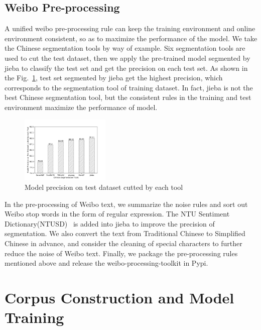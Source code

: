 \documentclass[runningheads]{llncs}
\begin{document}
\subsection{Weibo Pre-processing}

A unified weibo pre-processing rule can keep the training environment and online environment consistent, so as to maximize the performance of the model. We take the Chinese segmentation tools by way of example. Six segmentation tools are used to cut the test dataset, then we apply the pre-trained model segmented by jieba to classify the test set and get the precision on each test set. As shown in the Fig.~\ref{fig:segmentation-tools-precision}, test set segmented by jieba get the highest precision, which corresponds to the segmentation tool of training dataset. In fact, jieba is not the best Chinese segmentation tool, but the consistent rules in the training and test environment maximize the performance of model.

\begin{figure}[ht]
\begin{center}
\includegraphics[width=0.38\textwidth]{images/model-precision-on-test-dataset-cutted-by-each-tool.png}
\caption{Model precision on test dataset cutted by each tool}
\label{fig:segmentation-tools-precision}
\end{center}
\end{figure}

In the pre-processing of Weibo text, we summarize the noise rules and sort out Weibo stop words in the form of regular expression. The NTU Sentiment Dictionary(NTUSD)~\cite{ku2006opinion} is added into jieba to improve the precision of segmentation. We also convert the text from Traditional Chinese to Simplified Chinese in advance, and consider the cleaning of special characters to further reduce the noise of Weibo text. Finally, we package the pre-processing rules mentioned above and release the weibo-processing-toolkit in Pypi. 

\section{Corpus Construction and Model Training}
\end{document}
